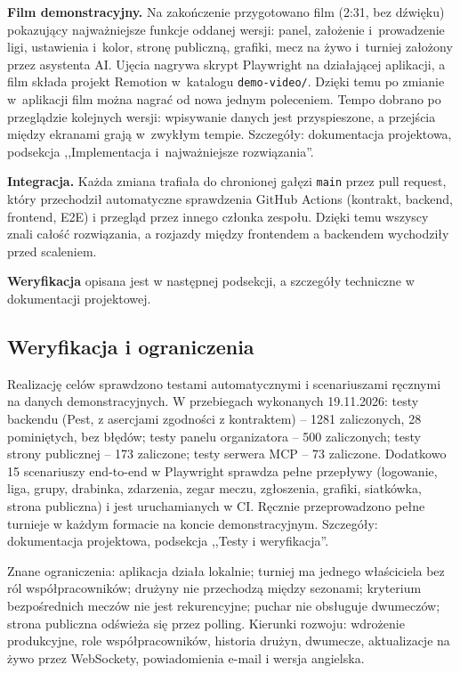 \documentclass[11pt,a4paper,oneside]{article}
\newif\ifpodpowiedzi
\newcommand{\podpowiedz}[1]{\ifpodpowiedzi\par\begingroup\small\color{hintcolor}\textit{Wskazówka: #1}\par\endgroup\fi}
\begin{document}
\textbf{Film demonstracyjny.} Na zakończenie przygotowano film (2:31, bez dźwięku) pokazujący najważniejsze funkcje oddanej wersji: panel, założenie i~prowadzenie ligi, ustawienia i~kolor, stronę publiczną, grafiki, mecz na żywo i~turniej założony przez asystenta AI. Ujęcia nagrywa skrypt Playwright na działającej aplikacji, a film składa projekt Remotion w~katalogu \texttt{demo-video/}. Dzięki temu po zmianie w~aplikacji film można nagrać od nowa jednym poleceniem. Tempo dobrano po przeglądzie kolejnych wersji: wpisywanie danych jest przyspieszone, a przejścia między ekranami grają w~zwykłym tempie. Szczegóły: dokumentacja projektowa, podsekcja ,,Implementacja i~najważniejsze rozwiązania''.

\textbf{Integracja.} Każda zmiana trafiała do chronionej gałęzi \texttt{main} przez pull request, który przechodził automatyczne sprawdzenia GitHub Actions (kontrakt, backend, frontend, E2E) i przegląd przez innego członka zespołu. Dzięki temu wszyscy znali całość rozwiązania, a rozjazdy między frontendem a backendem wychodziły przed scaleniem.

\textbf{Weryfikacja} opisana jest w następnej podsekcji, a szczegóły techniczne w dokumentacji projektowej.

\subsection{Weryfikacja i ograniczenia}
\podpowiedz{Opisz, jak sprawdzono realizację celów i jakość rezultatu. Wskaż testy lub inne sprawdzenia, ich wyniki oraz odwołania do dokumentacji. Podaj znane ograniczenia, problemy i możliwe kierunki rozwoju.}
Realizację celów sprawdzono testami automatycznymi i scenariuszami ręcznymi na danych demonstracyjnych. W przebiegach wykonanych 19.11.2026: testy backendu (Pest, z asercjami zgodności z kontraktem) -- 1281 zaliczonych, 28 pominiętych, bez błędów; testy panelu organizatora -- 500 zaliczonych; testy strony publicznej -- 173 zaliczone; testy serwera MCP -- 73 zaliczone. Dodatkowo 15 scenariuszy end-to-end w Playwright sprawdza pełne przepływy (logowanie, liga, grupy, drabinka, zdarzenia, zegar meczu, zgłoszenia, grafiki, siatkówka, strona publiczna) i jest uruchamianych w CI. Ręcznie przeprowadzono pełne turnieje w każdym formacie na koncie demonstracyjnym. Szczegóły: dokumentacja projektowa, podsekcja ,,Testy i weryfikacja''.

Znane ograniczenia: aplikacja działa lokalnie; turniej ma jednego właściciela bez ról współpracowników; drużyny nie przechodzą między sezonami; kryterium bezpośrednich meczów nie jest rekurencyjne; puchar nie obsługuje dwumeczów; strona publiczna odświeża się przez polling. Kierunki rozwoju: wdrożenie produkcyjne, role współpracowników, historia drużyn, dwumecze, aktualizacje na żywo przez WebSockety, powiadomienia e-mail i wersja angielska.
\end{document}
